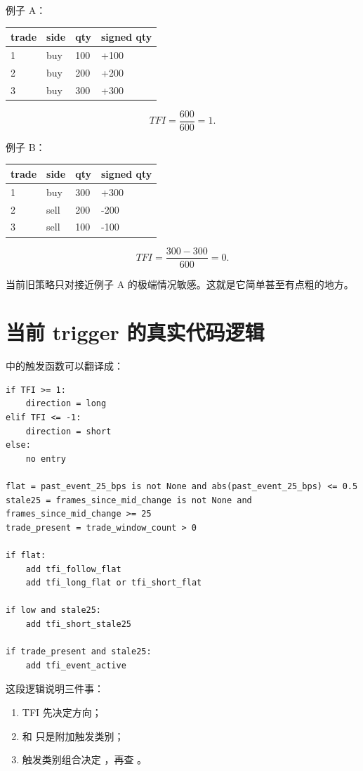 例子 A：

\begin{longtable}{p{}p{}p{}p{}}
\toprule
trade & side & qty & signed qty \\
\midrule
1 & buy & 100 & +100 \\
2 & buy & 200 & +200 \\
3 & buy & 300 & +300 \\
\bottomrule
\end{longtable}

\[
TFI = \frac{600}{600} = 1.
\]

例子 B：

\begin{longtable}{p{}p{}p{}p{}}
\toprule
trade & side & qty & signed qty \\
\midrule
1 & buy & 300 & +300 \\
2 & sell & 200 & -200 \\
3 & sell & 100 & -100 \\
\bottomrule
\end{longtable}

\[
TFI = \frac{300-300}{600}=0.
\]

当前旧策略只对接近例子 A 的极端情况敏感。这就是它简单甚至有点粗的地方。

\section{当前 trigger 的真实代码逻辑}

 中的触发函数可以翻译成：

\begin{lstlisting}
if TFI >= 1:
    direction = long
elif TFI <= -1:
    direction = short
else:
    no entry

flat = past_event_25_bps is not None and abs(past_event_25_bps) <= 0.5
stale25 = frames_since_mid_change is not None and frames_since_mid_change >= 25
trade_present = trade_window_count > 0

if flat:
    add tfi_follow_flat
    add tfi_long_flat or tfi_short_flat

if low and stale25:
    add tfi_short_stale25

if trade_present and stale25:
    add tfi_event_active
\end{lstlisting}

这段逻辑说明三件事：

\begin{enumerate}[leftmargin=2em]
  \item TFI 先决定方向；
  \item {} 和  只是附加触发类别；
  \item 触发类别组合决定 ，再查 。
\end{enumerate}

